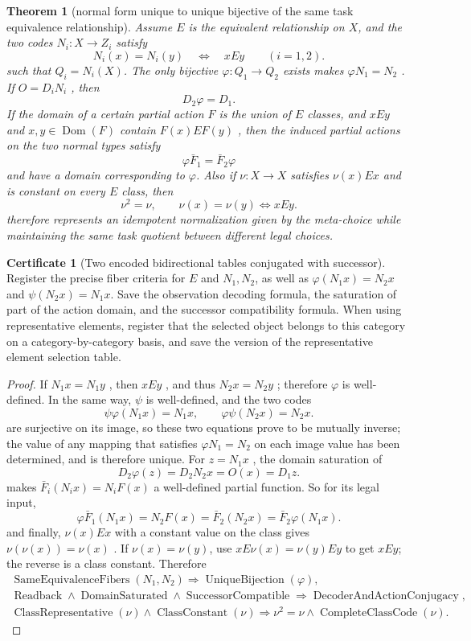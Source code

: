 \documentclass[12pt,a4paper,openany,notitlepage]{report}
\theoremstyle{plain}
\newtheorem{theorem}{Theorem}[chapter]
\theoremstyle{definition}
\newtheorem*{certificate}{Certificate}
\theoremstyle{remark}
\begin{document}
\begin{CJK*}
\begin{theorem}
[normal form unique to unique bijective of the same task equivalence relationship]\label{exp:gov:normalform-unique}
Assume $E$ is the equivalent relationship on $X$, and the two codes $N_i:X\to Z_i$ satisfy \[
 N_i(x)=N_i(y)\quad\Longleftrightarrow\quad xEy
 \qquad(i=1,2).
\] such that $Q_i=N_i(X)$. The only bijective $\varphi:Q_1\to Q_2$ exists makes $\varphi N_1=N_2$ . If $O=D_iN_i$ , then \[
 D_2\varphi=D_1.
\] If the domain of a certain partial action $F$ is the union of $E$ classes, and $xEy$ and $x,y\in\operatorname{Dom}(F)$ contain $F(x)EF(y)$ , then the induced partial actions on the two normal types satisfy \[
 \varphi\bar F_1=\bar F_2\varphi
\] and have a domain corresponding to $\varphi$. Also if $\nu:X\to X$ satisfies $\nu(x)Ex$ and is constant on every $E$ class, then \[
 \nu^2=\nu,\qquad
 \nu(x)=\nu(y)\Longleftrightarrow xEy.
\] therefore represents an idempotent normalization given by the meta-choice while maintaining the same task quotient between different legal choices.\end{theorem}
\begin{certificate}
[Two encoded bidirectional tables conjugated with successor]Register the precise fiber criteria for $E$ and $N_1,N_2$, as well as $\varphi(N_1x)=N_2x$ and $\psi(N_2x)=N_1x$. Save the observation decoding formula, the saturation of part of the action domain, and the successor compatibility formula. When using representative elements, register that the selected object belongs to this category on a category-by-category basis, and save the version of the representative element selection table.\end{certificate}
\begin{proof}
If $N_1x=N_1y$ , then $xEy$ , and thus $N_2x=N_2y$ ; therefore $\varphi$ is well-defined. In the same way, $\psi$ is well-defined, and the two codes \[
 \psi\varphi(N_1x)=N_1x,\qquad
 \varphi\psi(N_2x)=N_2x.
\] are surjective on its image, so these two equations prove to be mutually inverse; the value of any mapping that satisfies $\varphi N_1=N_2$ on each image value has been determined, and is therefore unique. For $z=N_1x$ , the domain saturation of \[
 D_2\varphi(z)=D_2N_2x=O(x)=D_1z.
\] makes $\bar F_i(N_ix)=N_iF(x)$ a well-defined partial function. So for its legal input, \[
 \varphi\bar F_1(N_1x)=N_2F(x)
 =\bar F_2(N_2x)=\bar F_2\varphi(N_1x).
\] and finally, $\nu(x)Ex$ with a constant value on the class gives $\nu(\nu(x))=\nu(x)$ . If $\nu(x)=\nu(y)$, use $xE\nu(x)=\nu(y)Ey$ to get $xEy$; the reverse is a class constant. Therefore \[
\begin{gathered}
 \operatorname{SameEquivalenceFibers}(N_1,N_2)
 \Rightarrow\operatorname{UniqueBijection}(\varphi),\\
 \operatorname{Readback}\land\operatorname{DomainSaturated}
 \land\operatorname{SuccessorCompatible}
 \Rightarrow\operatorname{DecoderAndActionConjugacy},\\
 \operatorname{ClassRepresentative}(\nu)\land\operatorname{ClassConstant}(\nu)
 \Rightarrow\nu^2=\nu\land\operatorname{CompleteClassCode}(\nu).
\end{gathered}
\]\end{proof}



\end{CJK*}
\end{document}
